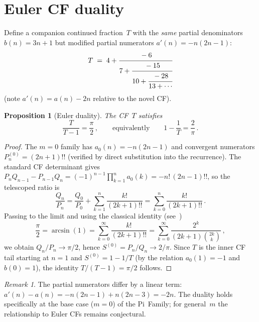 \documentclass[11pt]{article}
\newcommand{\dff}[1]{(#1)!!}
\newtheorem{proposition}[theorem]{Proposition}
\theoremstyle{remark}
\newtheorem{remark}[theorem]{Remark}
\begin{document}
\section{Euler CF duality}\label{sec:euler}

Define a companion continued fraction~$T$ with the \emph{same}
partial denominators $b(n) = 3n{+}1$ but modified partial numerators
$a'(n) = -n(2n{-}1)$:
\[
  T \;=\; 4 + \cfrac{-6}{7 + \cfrac{-15}{10 + \cfrac{-28}{13 + \cdots}}}
\]
(note $a'(n) = a(n) - 2n$ relative to the novel CF).

\begin{proposition}[Euler duality]\label{prop:euler}
The CF~$T$ satisfies
\[
  \frac{T}{T-1} = \frac{\pi}{2}\,,
  \qquad\text{equivalently}\qquad
  1 - \frac{1}{T} = \frac{2}{\pi}\,.
\]
\end{proposition}

\begin{proof}
The $m{=}0$ family has $a_0(n) = -n(2n{-}1)$ and
convergent numerators $P_n^{(0)} = (2n{+}1)!!$
(verified by direct substitution into the recurrence).
The standard CF determinant gives
$P_n Q_{n-1} - P_{n-1} Q_n = (-1)^{n-1}\prod_{k=1}^n a_0(k)
= -n!\,(2n{-}1)!!$,
so the telescoped ratio is
\[
  \frac{Q_n}{P_n}
  = \frac{Q_0}{P_0}
    + \sum_{k=1}^{n} \frac{k!}{\dff{2k{+}1}}
  = \sum_{k=0}^{n} \frac{k!}{\dff{2k{+}1}}\,.
\]
Passing to the limit and using the classical identity
(see~\cite[\S4.24.2]{dlmf})
\begin{equation}\label{eq:arcsin}
  \frac{\pi}{2} = \arcsin(1)
  = \sum_{k=0}^{\infty}\frac{k!}{\dff{2k{+}1}}
  = \sum_{k=0}^{\infty}\frac{2^k}{(2k{+}1)\binom{2k}{k}}\,,
\end{equation}
we obtain $Q_n/P_n \to \pi/2$, hence
$S^{(0)} = P_n/Q_n \to 2/\pi$.
Since $T$ is the inner CF tail starting at $n{=}1$ and
$S^{(0)} = 1 - 1/T$
(by the relation $a_0(1) = -1$ and $b(0) = 1$),
the identity $T/(T{-}1) = \pi/2$ follows.
\end{proof}

\begin{remark}
The partial numerators differ by a linear term:
$a'(n) - a(n) = -n(2n{-}1) + n(2n{-}3) = -2n$.
The duality holds specifically at the base case ($m=0$) of the
Pi~Family; for general~$m$ the relationship to Euler CFs remains
conjectural.
\end{remark}


\end{document}
